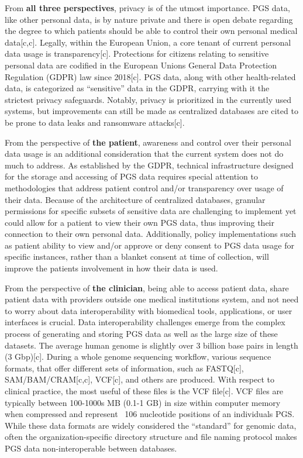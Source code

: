 \documentclass{article}
\begin{document}
From \textbf{all three perspectives}, privacy is of the utmost importance. 
PGS data, like other personal data, is by nature private and there is open debate regarding the degree to which patients should be able to control their own personal medical data[c,c]. 
Legally, within the European Union, a core tenant of current personal data usage is transparency[c]. 
Protections for citizens relating to sensitive personal data are codified in the European Union\textquotesingle s General Data Protection Regulation (GDPR) law since 2018[c]. 
PGS data, along with other health-related data, is categorized as “sensitive” data in the GDPR, carrying with it the strictest privacy safeguards. 
Notably, privacy is prioritized in the currently used systems, but improvements can still be made as centralized databases are cited to be prone to data leaks and ransomware attacks[c]. 

From the perspective of \textbf{the patient}, awareness and control over their personal data usage is an additional consideration that the current system does not do much to address. 
As established by the GDPR, technical infrastructure designed for the storage and accessing of PGS data requires special attention to methodologies that address patient control and/or transparency over usage of their data. 
Because of the architecture of centralized databases, granular permissions for specific subsets of sensitive data are challenging to implement yet could allow for a patient to view their own PGS data, thus improving their connection to their own personal data. 
Additionally, policy implementations such as patient ability to view and/or approve or deny consent to PGS data usage for specific instances, rather than a blanket consent at time of collection, will improve the patient\textquotesingle s involvement in how their data is used. 

From the perspective of \textbf{the clinician}, being able to access patient data, share patient data with providers outside one medical institution\textquotesingle s system, and not need to worry about data interoperability with biomedical tools, applications, or user interfaces is crucial. 
Data interoperability challenges emerge from the complex process of generating and storing PGS data as well as the large size of these datasets. 
The average human genome is slightly over 3 billion base pairs in length (3 Gbp)[c]. 
During a whole genome sequencing workflow, various sequence formats, that offer different sets of information, such as FASTQ[c], SAM/BAM/CRAM[c,c], VCF[c], and others are produced. 
With respect to clinical practice, the most useful of these files is the VCF file[c]. 
VCF files are typically between 100-1000s MB (0.1-1 GB) in size within computer memory when compressed and represent ~106 nucleotide positions of an individual\textquotesingle s PGS. 
While these data formats are widely considered the “standard” for genomic data, often the organization-specific directory structure and file naming protocol makes PGS data non-interoperable between databases.
\end{document}

